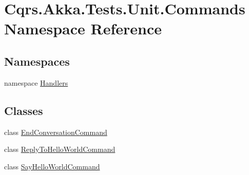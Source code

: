 \hypertarget{namespaceCqrs_1_1Akka_1_1Tests_1_1Unit_1_1Commands}{}\section{Cqrs.\+Akka.\+Tests.\+Unit.\+Commands Namespace Reference}
\label{namespaceCqrs_1_1Akka_1_1Tests_1_1Unit_1_1Commands}
\subsection*{Namespaces}
\begin{DoxyCompactItemize}
\item 
namespace \hyperlink{namespaceCqrs_1_1Akka_1_1Tests_1_1Unit_1_1Commands_1_1Handlers}{Handlers}
\end{DoxyCompactItemize}
\subsection*{Classes}
\begin{DoxyCompactItemize}
\item 
class \hyperlink{classCqrs_1_1Akka_1_1Tests_1_1Unit_1_1Commands_1_1EndConversationCommand}{End\+Conversation\+Command}
\item 
class \hyperlink{classCqrs_1_1Akka_1_1Tests_1_1Unit_1_1Commands_1_1ReplyToHelloWorldCommand}{Reply\+To\+Hello\+World\+Command}
\item 
class \hyperlink{classCqrs_1_1Akka_1_1Tests_1_1Unit_1_1Commands_1_1SayHelloWorldCommand}{Say\+Hello\+World\+Command}
\end{DoxyCompactItemize}
